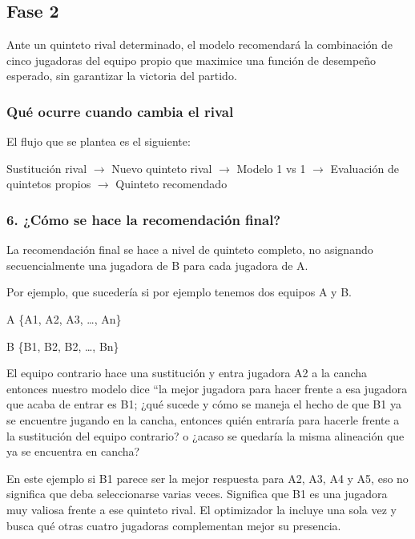 \subsection{Fase 2}
Ante un quinteto rival determinado, el modelo recomendará la combinación de cinco jugadoras del equipo propio que maximice una función de desempeño esperado, sin garantizar la victoria del partido.

\subsubsection*{Qué ocurre cuando cambia el rival}
El flujo que se plantea es el siguiente:

\begin{center}
Sustitución rival $\longrightarrow$ Nuevo quinteto rival $\longrightarrow$ Modelo 1 vs 1 $\longrightarrow$ Evaluación de quintetos propios $\longrightarrow$ Quinteto recomendado
\end{center}

\subsubsection*{6. ¿Cómo se hace la recomendación final?}
La recomendación final se hace a nivel de quinteto completo, no asignando secuencialmente una jugadora de B para cada jugadora de A.

Por ejemplo, que sucedería si por ejemplo tenemos dos equipos A y B.

A \{A1, A2, A3, \ldots, An\}

B \{B1, B2, B2, \ldots, Bn\}

El equipo contrario hace una sustitución y entra jugadora A2 a la cancha entonces nuestro modelo dice “la mejor jugadora para hacer frente a esa jugadora que acaba de entrar es B1; ¿qué sucede y cómo se maneja el hecho de que B1 ya se encuentre jugando en la cancha, entonces quién entraría para hacerle frente a la sustitución del equipo contrario? o ¿acaso se quedaría la misma alineación que ya se encuentra en cancha?

En este ejemplo si B1 parece ser la mejor respuesta para A2, A3, A4 y A5, eso no significa que deba seleccionarse varias veces. Significa que B1 es una jugadora muy valiosa frente a ese quinteto rival. El optimizador la incluye una sola vez y busca qué otras cuatro jugadoras complementan mejor su presencia.

